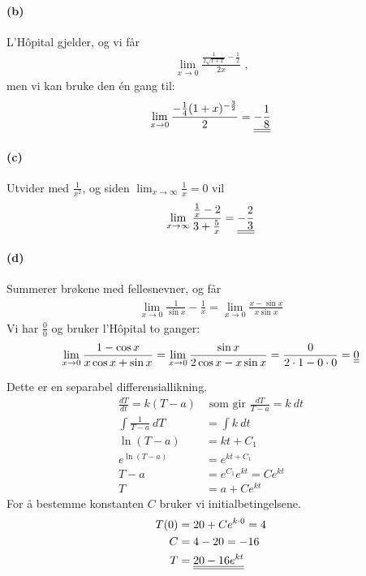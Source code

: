 \documentclass[a4paper,norsk,12pt]{article}
\begin{document}
\paragraph{(b)}
L'Hôpital gjelder, og vi får
\begin{align*}
  \lim_{x\to 0}\frac{ \frac{1}{2\sqrt{1+x}} -\frac{1}{2} }{2x} \text{ ,}
\end{align*}
men vi kan bruke den én gang til:
\begin{align*}
  \lim_{x\to 0}\frac{ -\frac{1}{4}(1+x)^{-\frac{3}{2}} }{2} =
    {\underline{\underline{-\frac{1}{8}}}}
\end{align*}

\paragraph{(c)}
Utvider med $\frac{1}{x^2}$, og siden $\lim_{x\to\infty}\frac{1}{x} = 0$ vil
\begin{align*}
  \lim_{x\to\infty}{\frac{\frac{1}{x}-2}{3+\frac{5}{x}}} = {\underline{\underline{-\frac{2}{3}}}} \\
\end{align*}

\paragraph{(d)}
Summerer brøkene med fellesnevner, og får
\begin{align*}
  \lim_{x\to 0}\frac{1}{\sin{x}} - \frac{1}{x} =
  \lim_{x\to 0}\frac{x - \sin{x}}{x\sin{x}}
\end{align*}
Vi har $\frac{0}{0}$ og bruker l'Hôpital to ganger:
\begin{align*}
  \lim_{x\to 0}\frac{1 - \cos{x}}{x\cos{x} + \sin{x}} =
  \lim_{x\to 0}{\frac{\sin{x}}{2\cos{x} - x\sin{x}}} =
  \frac{0}{2\cdot1 - 0 \cdot 0} = {\underline{\underline{0}}}
\end{align*}

Dette er en separabel differensiallikning.
\begin{align*}
  \frac{dT}{dt}  = k(T-a) & \text{ som gir }
  \frac{dT}{T-a}  = k~dt \\
  \int{\frac{1}{T-a}~dT} & = \int{ k~dt } \\
  \ln{(T-a)} & = kt + C_1 \\
  e^{\ln{(T-a)}} & = e^{kt + C_1} \\
  T-a & = e^{C_1} e^{kt} = Ce^{kt} \\
  T & = a + Ce^{kt}
\end{align*}
For å bestemme konstanten $C$ bruker vi initialbetingelsene.
\begin{align*}
  T(0) &= 20 + Ce^{k\cdot0} = 4 \\
  C &= 4 - 20 = -16 \\
  T &= {\underline{\underline{20 - 16e^{kt}}}}
\end{align*}
\end{document}
